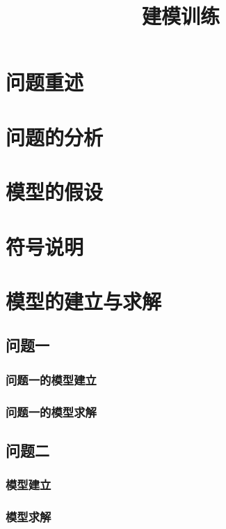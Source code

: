 \documentclass{../../Template/cumcmthesis} %
\title{建模训练} %
\begin{document}
\listoftodos
\maketitle



\section{问题重述}
  
\section{问题的分析}
  
\section{模型的假设}
  
\section{符号说明}
  
\section{模型的建立与求解}

\subsection{问题一}
  \subsubsection{问题一的模型建立}
    
  \subsubsection{问题一的模型求解}
    
\subsection{问题二}
  \subsubsection{模型建立}
    
  \subsubsection{模型求解}
    
\end{document}
